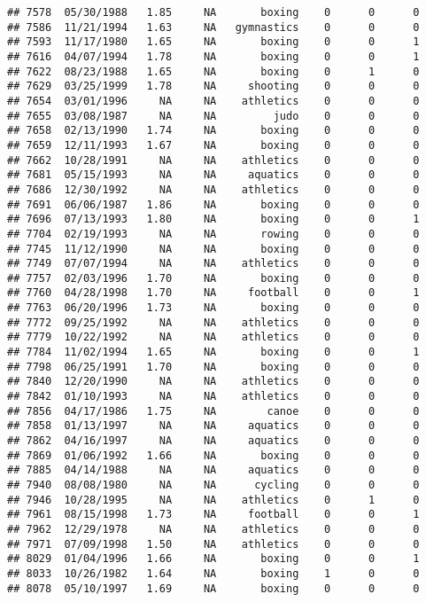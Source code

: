 \documentclass[]{article}
\begin{document}
\begin{verbatim}
## 7578  05/30/1988   1.85     NA       boxing    0      0      0
## 7586  11/21/1994   1.63     NA   gymnastics    0      0      0
## 7593  11/17/1980   1.65     NA       boxing    0      0      1
## 7616  04/07/1994   1.78     NA       boxing    0      0      1
## 7622  08/23/1988   1.65     NA       boxing    0      1      0
## 7629  03/25/1999   1.78     NA     shooting    0      0      0
## 7654  03/01/1996     NA     NA    athletics    0      0      0
## 7655  03/08/1987     NA     NA         judo    0      0      0
## 7658  02/13/1990   1.74     NA       boxing    0      0      0
## 7659  12/11/1993   1.67     NA       boxing    0      0      0
## 7662  10/28/1991     NA     NA    athletics    0      0      0
## 7681  05/15/1993     NA     NA     aquatics    0      0      0
## 7686  12/30/1992     NA     NA    athletics    0      0      0
## 7691  06/06/1987   1.86     NA       boxing    0      0      0
## 7696  07/13/1993   1.80     NA       boxing    0      0      1
## 7704  02/19/1993     NA     NA       rowing    0      0      0
## 7745  11/12/1990     NA     NA       boxing    0      0      0
## 7749  07/07/1994     NA     NA    athletics    0      0      0
## 7757  02/03/1996   1.70     NA       boxing    0      0      0
## 7760  04/28/1998   1.70     NA     football    0      0      1
## 7763  06/20/1996   1.73     NA       boxing    0      0      0
## 7772  09/25/1992     NA     NA    athletics    0      0      0
## 7779  10/22/1992     NA     NA    athletics    0      0      0
## 7784  11/02/1994   1.65     NA       boxing    0      0      1
## 7798  06/25/1991   1.70     NA       boxing    0      0      0
## 7840  12/20/1990     NA     NA    athletics    0      0      0
## 7842  01/10/1993     NA     NA    athletics    0      0      0
## 7856  04/17/1986   1.75     NA        canoe    0      0      0
## 7858  01/13/1997     NA     NA     aquatics    0      0      0
## 7862  04/16/1997     NA     NA     aquatics    0      0      0
## 7869  01/06/1992   1.66     NA       boxing    0      0      0
## 7885  04/14/1988     NA     NA     aquatics    0      0      0
## 7940  08/08/1980     NA     NA      cycling    0      0      0
## 7946  10/28/1995     NA     NA    athletics    0      1      0
## 7961  08/15/1998   1.73     NA     football    0      0      1
## 7962  12/29/1978     NA     NA    athletics    0      0      0
## 7971  07/09/1998   1.50     NA    athletics    0      0      0
## 8029  01/04/1996   1.66     NA       boxing    0      0      1
## 8033  10/26/1982   1.64     NA       boxing    1      0      0
## 8078  05/10/1997   1.69     NA       boxing    0      0      0

\end{verbatim}
\end{document}
